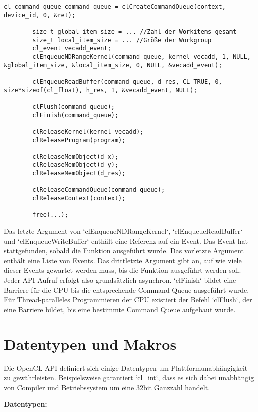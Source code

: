 		\newpage
		\begin{lstlisting}[caption=~Command Queues und Clean-Up]
		cl_command_queue command_queue = clCreateCommandQueue(context, device_id, 0, &ret);
		
		size_t global_item_size = ... //Zahl der Workitems gesamt
		size_t local_item_size = ... //Größe der Workgroup
		cl_event vecadd_event;
		clEnqueueNDRangeKernel(command_queue, kernel_vecadd, 1, NULL, &global_item_size, &local_item_size, 0, NULL, &vecadd_event);
		
		clEnqueueReadBuffer(command_queue, d_res, CL_TRUE, 0, size*sizeof(cl_float), h_res, 1, &vecadd_event, NULL);  
			
		clFlush(command_queue);
		clFinish(command_queue);
		
		clReleaseKernel(kernel_vecadd);
		clReleaseProgram(program);
  
		clReleaseMemObject(d_x);
		clReleaseMemObject(d_y);
		clReleaseMemObject(d_res);

		clReleaseCommandQueue(command_queue);
		clReleaseContext(context);

		free(...);
		\end{lstlisting}
		Das letzte Argument von \li`clEnqueueNDRangeKernel`, \li`clEnqueueReadBuffer` und \li`clEnqueueWriteBuffer` enthält eine Referenz auf ein Event. Das Event hat stattgefunden, sobald die Funktion ausgeführt wurde. Das vorletzte Argument enthält eine Liste von Events. Das drittletzte Argument gibt an, auf wie viele dieser Events gewartet werden muss, bis die Funktion ausgeführt werden soll. Jeder \Gls{API} Aufruf erfolgt also grundsätzlich asynchron. \li`clFinish` bildet eine Barriere für die CPU bis die entsprechende \Gls{Command Queue} ausgeführt wurde. Für Thread-paralleles Programmieren der CPU existiert der Befehl \li`clFlush`, der eine Barriere bildet, bis eine bestimmte \Gls{Command Queue} aufgebaut wurde.
			
		\section{Datentypen und Makros}\label{makros}
		Die OpenCL \Gls{API} definiert sich einige Datentypen um Plattformunabhängigkeit zu gewährleisten. Beispielsweise garantiert \li`cl_int`, dass es sich dabei unabhängig von Compiler und Betriebssystem um eine 32bit Ganzzahl handelt.
		
		\textbf{Datentypen:}		
		
